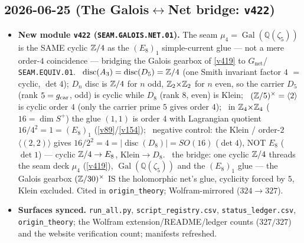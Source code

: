 \subsection*{2026-06-25 (The Galois$\leftrightarrow$Net bridge: \texttt{v422})}
\begin{itemize}
\item \textbf{New module \texttt{v422} (\texttt{SEAM.GALOIS.NET.01}).} The seam
$\mu_4=\operatorname{Gal}(\mathbb Q(\zeta_5))$ is the SAME cyclic $\mathbb{Z}/4$ as the $(E_8)_1$ simple-current glue
--- not a mere order-$4$ coincidence --- bridging the Galois gearbox of \vref{v419} to $G_{\mathrm{net}}$/%
\texttt{SEAM.EQUIV.01}. \mE\ $\operatorname{disc}(A_3)=\operatorname{disc}(D_5)=\mathbb{Z}/4$ (one Smith invariant
factor $4$ $=$ cyclic, $\det4$); $D_n$ disc is $\mathbb{Z}/4$ for $n$ odd, $\mathbb{Z}_2{\times}\mathbb{Z}_2$ for $n$ even, so the
carrier $D_5$ (rank $5=g_{\mathrm{car}}$, odd) is cyclic while $D_8$ (rank $8$, even) is Klein; \mE\
$(\mathbb{Z}/5)^\times=\langle2\rangle$ is cyclic order $4$ (only the carrier prime $5$ gives order $4$); \mE\ in
$\mathbb{Z}_4{\times}\mathbb{Z}_4$ ($16=\dim S^+$) the glue $(1,1)$ is order $4$ with Lagrangian quotient
$16/4^2=1=(E_8)_1$ (\vref{v89}/\vref{v154}); \mE\ negative control: the Klein / order-$2$
$\langle(2,2)\rangle$ gives $16/2^2=4=|\!\operatorname{disc}(D_8)|=SO(16)$ ($\det4$), NOT $E_8$ ($\det1$) ---
cyclic $\mathbb{Z}/4\to E_8$, Klein$\to D_8$. \mC\ the bridge: one cyclic $\mathbb{Z}/4$ threads the seam deck $\mu_4$
(\vref{v419}), $\operatorname{Gal}(\mathbb Q(\zeta_5))$ and the $(E_8)_1$ glue --- the Galois gearbox
$(\mathbb{Z}/30)^\times$ IS the holomorphic net's glue, cyclicity forced by $5$, Klein excluded. Cited in
\texttt{origin\_theory}; Wolfram-mirrored ($324\to327$).
\item \textbf{Surfaces synced.} \texttt{run\_all.py}, \texttt{script\_registry.csv},
\texttt{status\_ledger.csv}, \texttt{origin\_theory}; the Wolfram extension/README/ledger counts
($327/327$) and the website verification count; manifests refreshed.
\end{itemize}

